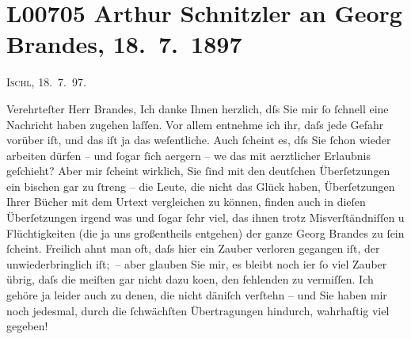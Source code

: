 

\section[Arthur Schnitzler an Georg Brandes, 18. 7. 1897]{L00705 Arthur Schnitzler an Georg Brandes, 18. 7. 1897}
\nopagebreak{}
\rehead{ }\normalsize\beginnumbering{}
\toendnotes[C]{\smallbreak\pagebreak[2]}
\toendnotes[C]{\smallbreak}
\pstart
           \raggedleft{}{\pb}\textsc{Ischl}, 18. 7. 97.\pend
           
\pstart{}Verehrteſter Herr Brandes,\pend\vspace{0.5em}
\pstart
           Ich danke Ihnen herzlich, dſs Sie mir{ }ſo{ }ſchnell eine Nachricht haben zugehen laſſen.
               Vor allem entnehme ich ihr, daſs jede Gefahr vorüber iſt, und das iſt ja das
               weſentliche. Auch{ }ſcheint es, dſs Sie{ }ſchon wieder arbeiten dürfen – und{ }ſogar{ }ſich
               aergern – we{\geminationn} das mit aerztlicher {\pb}Erlaubnis geſchieht? Aber mir{ }ſcheint wirklich,
               Sie{ }ſind mit den deutſchen Überſetzungen ein bischen gar zu{ }ſtreng – die Leute, die
               nicht das Glück haben, Überſetzungen Ihrer Bücher mit dem Urtext vergleichen zu
               können, finden auch in dieſen Überſetzungen irgend was und{ }ſogar{ }ſehr viel, das \introOben{}ihnen\introOben{} trotz Misverſtändniſſen u Flüchtigkeiten (die ja uns
                  \introOben{}großentheils\introOben{} entgehen) der ganze Georg Brandes zu{ }ſein{ }ſcheint. {\pb}Freilich ahnt man oft, daſs hier ein
               Zauber verloren gegangen iſt, der unwiederbringlich iſt; – aber glauben Sie mir, es
               bleibt noch i{\geminationm}er{ }ſo viel Zauber übrig, daſs die meiſten
               gar nicht dazu ko{\geminationm}en, den fehlenden zu vermiſſen. Ich
               gehöre ja leider auch zu denen, die nicht däniſch verſtehn – und Sie haben mir noch jedesmal, durch die{ }ſchwächſten
               Übertragungen hindurch, wahrhaftig {\pb}viel
               gegeben!\pend
           
